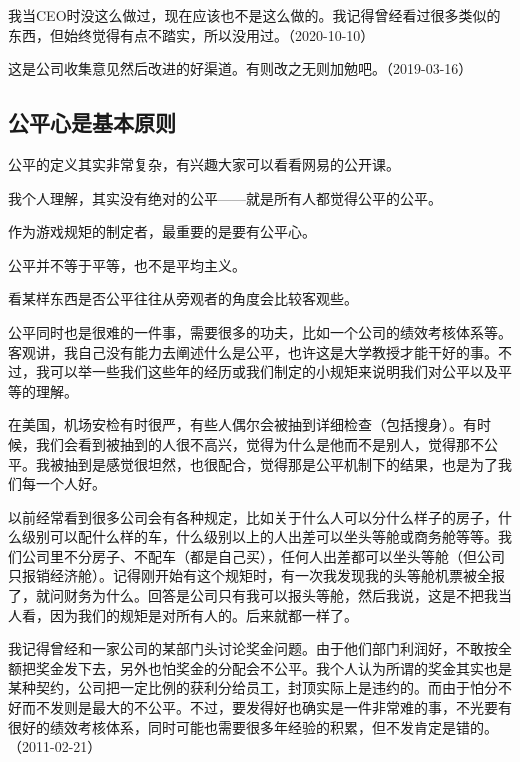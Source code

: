 我当CEO时没这么做过，现在应该也不是这么做的。我记得曾经看过很多类似的东西，但始终觉得有点不踏实，所以没用过。（2020-10-10）


这是公司收集意见然后改进的好渠道。有则改之无则加勉吧。（2019-03-16）

\subsection{公平心是基本原则}

公平的定义其实非常复杂，有兴趣大家可以看看网易的公开课。

我个人理解，其实没有绝对的公平——就是所有人都觉得公平的公平。

作为游戏规矩的制定者，最重要的是要有公平心。

公平并不等于平等，也不是平均主义。

看某样东西是否公平往往从旁观者的角度会比较客观些。

公平同时也是很难的一件事，需要很多的功夫，比如一个公司的绩效考核体系等。客观讲，我自己没有能力去阐述什么是公平，也许这是大学教授才能干好的事。不过，我可以举一些我们这些年的经历或我们制定的小规矩来说明我们对公平以及平等的理解。

在美国，机场安检有时很严，有些人偶尔会被抽到详细检查（包括搜身）。有时候，我们会看到被抽到的人很不高兴，觉得为什么是他而不是别人，觉得那不公平。我被抽到是感觉很坦然，也很配合，觉得那是公平机制下的结果，也是为了我们每一个人好。

以前经常看到很多公司会有各种规定，比如关于什么人可以分什么样子的房子，什么级别可以配什么样的车，什么级别以上的人出差可以坐头等舱或商务舱等等。我们公司里不分房子、不配车（都是自己买），任何人出差都可以坐头等舱（但公司只报销经济舱）。记得刚开始有这个规矩时，有一次我发现我的头等舱机票被全报了，就问财务为什么。回答是公司只有我可以报头等舱，然后我说，这是不把我当人看，因为我们的规矩是对所有人的。后来就都一样了。

我记得曾经和一家公司的某部门头讨论奖金问题。由于他们部门利润好，不敢按全额把奖金发下去，另外也怕奖金的分配会不公平。我个人认为所谓的奖金其实也是某种契约，公司把一定比例的获利分给员工，封顶实际上是违约的。而由于怕分不好而不发则是最大的不公平。不过，要发得好也确实是一件非常难的事，不光要有很好的绩效考核体系，同时可能也需要很多年经验的积累，但不发肯定是错的。（2011-02-21）


